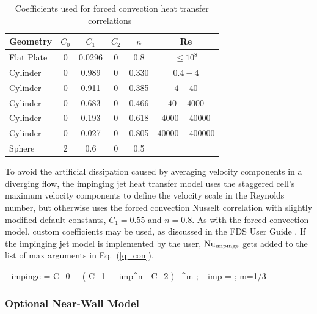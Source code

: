 \begin{table}[!ht]
\caption[Coefficients used for forced convection heat transfer correlations]{Coefficients used for forced convection heat transfer correlations~\cite{Incropera:1}}
\label{convective_heat_transfer_table}
\begin{center}
\begin{tabular}{|lccccc|}
\hline
Geometry     & $C_0$    & $C_1$   & $C_2$ & $n$    & Re             \\ \hline
Flat Plate   & 0        & 0.0296  & 0     & 0.8    & $\le 10^8$     \\
Cylinder     & 0        & 0.989   & 0     & 0.330  & $0.4-4$        \\
Cylinder     & 0        & 0.911   & 0     & 0.385  & $4-40$         \\
Cylinder     & 0        & 0.683   & 0     & 0.466  & $40-4000$      \\
Cylinder     & 0        & 0.193   & 0     & 0.618  & $4000-40000$   \\
Cylinder     & 0        & 0.027   & 0     & 0.805  & $40000-400000$ \\
Sphere       & 2        & 0.6     & 0     & 0.5    &                \\ \hline
\end{tabular}
\end{center}
\end{table}

To avoid the artificial dissipation caused by averaging velocity components in a diverging flow, the impinging jet heat transfer model uses the staggered cell's maximum velocity components to define the velocity scale in the Reynolds number, but otherwise uses the forced convection Nusselt correlation with slightly modified default constants, $C_1 = 0.55$ and $n=0.8$.  As with the forced convection model, custom coefficients may be used, as discussed in the FDS User Guide \cite{FDS_Users_Guide}.  If the impinging jet model is implemented by the user, $\hbox{Nu}_{\rm impinge}$ gets added to the list of max arguments in Eq.~(\ref{q_con}).

\be
   \NU_{\rm impinge} = C_0 + \left( C_1 \, \RE_{\rm imp}^n - C_2 \right) \, \PR^m  \quad ; \quad \RE_{\rm imp} =   \quad ; \quad m=1/3
\ee


\subsubsection{Optional Near-Wall Model}
\label{conflux_wall_model}

